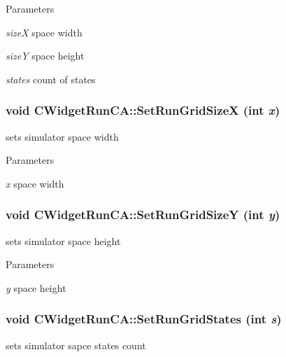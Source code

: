 \begin{DoxyParams}{Parameters}
\item[{\em sizeX}]space width \item[{\em sizeY}]space height \item[{\em states}]count of states \end{DoxyParams}
\hypertarget{classCWidgetRunCA_a59cd2d794a0e8d4d284a7e685d679ee7}{
\subsubsection[{SetRunGridSizeX}]{\setlength{\rightskip}{0pt plus 5cm}void CWidgetRunCA::SetRunGridSizeX (int {\em x})}}
\label{classCWidgetRunCA_a59cd2d794a0e8d4d284a7e685d679ee7}
sets simulator space width


\begin{DoxyParams}{Parameters}
\item[{\em x}]space width \end{DoxyParams}
\hypertarget{classCWidgetRunCA_a401b881aeab0f689d08d9c94542b8716}{
\subsubsection[{SetRunGridSizeY}]{\setlength{\rightskip}{0pt plus 5cm}void CWidgetRunCA::SetRunGridSizeY (int {\em y})}}
\label{classCWidgetRunCA_a401b881aeab0f689d08d9c94542b8716}
sets simulator space height


\begin{DoxyParams}{Parameters}
\item[{\em y}]space height \end{DoxyParams}
\hypertarget{classCWidgetRunCA_ac59bae3e136a55bcf7c858b1dee2cadc}{
\subsubsection[{SetRunGridStates}]{\setlength{\rightskip}{0pt plus 5cm}void CWidgetRunCA::SetRunGridStates (int {\em s})}}
\label{classCWidgetRunCA_ac59bae3e136a55bcf7c858b1dee2cadc}
sets simulator sapce states count


